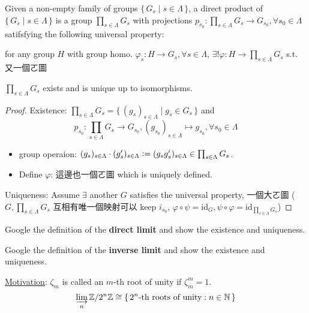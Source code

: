 \begin{definition}
  Given a non-empty family of groups $\{\, G_s \mid s \in \Lambda \,\}$,
  a direct product of $\{\, G_s \mid s \in \Lambda \,\}$ is a group
  $\prod_{s\in \Lambda} G_s$ with projections
  $p_{s_0}: \prod_{s\in \Lambda} G_s \to G_{s_0}, \forall s_0 \in \Lambda$
  satifsfying the following universal property:

  for any group $H$ with group homo.
  $\varphi_s: H \to G_s, \forall s \in \Lambda$, $\exists! \varphi:
  H \to \prod_{s\in \Lambda} G_s$ s.t. 又一個ㄛ圖
\end{definition}

\begin{theorem}
  $\prod_{s\in \Lambda} G_s$ exists and is unique up to isomorphisms.

  \begin{proof}
    Existence: $\prod_{s\in \Lambda} G_s = \{\, (g_s)_{s\in \Lambda}
      \mid g_s \in G_s \,\}$ and
      \[ p_{s_0}: \prod_{s\in \Lambda} G_s \to G_{s_0},
        (g_{s_0})_{s\in \Lambda} \mapsto g_{s_0}, \forall s_0 \in \Lambda \]
      \begin{itemize}
        \item group operaion: $(g_s)_{s \in \Lambda} \cdot (g_s')_{s \in \Lambda}
          \vcentcolon= (g_s g_s')_{s \in \Lambda} \in \prod_{s\in \Lambda} G_s$.
        \item Define $\varphi$:
          這邊也一個ㄛ圖
          which is uniquely defined.
      \end{itemize}

    Uniqueness: Assume $\exists$ another $G$ satisfies the universal property,
    一個大ㄛ圖 ($G, \prod_{s\in \Lambda} G_s$ 互相有唯一個映射可以
    keep $i_{s_0}$, $\varphi \circ \psi = \text{id}_{G}, \psi \circ \varphi
    = \text{id}_{\prod_{s\in \Lambda} G_s}$)
  \end{proof}
\end{theorem}

\begin{exercise}
  Google the definition of the {\bf direct limit} and show the existence and
  uniqueness.
\end{exercise}

\begin{exercise}
  Google the definition of the {\bf inverse limit} and show the existence and
  uniqueness.
\end{exercise}

\underline{Motivation}: $\zeta_m$ is called an $m$-th root of unity if
$\zeta_m^m = 1$.
\[ \varinjlim\limits_n {\mathbb{Z}}/{2^n\mathbb{Z}} \cong
\{\, \text{$2^n$-th roots of unity} : n \in \mathbb{N} \,\} \]


